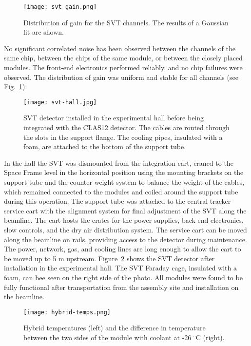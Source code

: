 \begin{figure}[hbt] 
\centering 
\texttt{[image: svt\_gain.png]}
\caption{Distribution of gain for the SVT channels. The results of a Gaussian fit are shown.}
\label{fig:svt_gain}
\end{figure}

No significant correlated noise has been observed between the channels of the same chip, between the chips of the same module, or between the closely placed modules. The front-end electronics performed reliably, and no chip failures were observed. The distribution of gain was uniform and stable for all channels (see Fig.~\ref{fig:svt_gain}). 
 
\begin{figure}[hbt] 
\centering 
\texttt{[image: svt-hall.jpg]}
\caption{SVT detector installed in the experimental hall before being integrated with the CLAS12 detector. The cables are routed through the slots in the support flange. The cooling pipes, insulated with a foam, are attached to the bottom of the support tube.}
\label{fig:svt-hall}
\end{figure}

In the hall the SVT was dismounted from the integration cart, craned to the Space Frame level in the horizontal position using the mounting brackets on the support tube and the counter weight system to balance the weight of the cables, which remained connected to the modules and coiled around the support tube during this operation. The support tube was attached to the central tracker service cart with the alignment system for final adjustment of the SVT along the beamline. The cart hosts the crates for the power supplies, back-end electronics, slow controls, and the dry air distribution system. The service cart can be moved along the beamline on rails, providing access to the detector during maintenance. The power, network, gas, and cooling lines are long enough to allow the cart to be moved up to 5 m upstream. Figure~\ref{fig:svt-hall} shows the SVT detector after installation in the experimental hall. The SVT Faraday cage, insulated with a foam, can bee seen on the right side of the photo. All modules were found to be fully functional after transportation from the assembly site and installation on the beamline. 

\begin{figure}[hbt] 
\centering 
\texttt{[image: hybrid-temps.png]}
\caption{Hybrid temperatures (left) and the difference in temperature between the two sides of the module with coolant at -26 $^\circ$C (right).}
\label{fig:hybrid-temps}
\end{figure}

